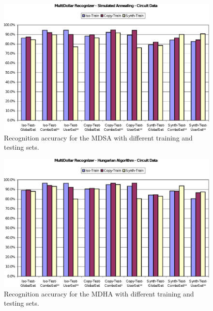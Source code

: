 \documentclass[final,5p,twocolumn]{elsarticle}
\begin{document}
\begin{figure}[p]
\begin{center}
\includegraphics[width=.9\hsize]{MultiDollarSACircuitChart.eps}
\end{center}
\caption{Recognition accuracy for the MDSA with different training and testing sets. }
\label{MultiDollarSACiruit}
\end{figure}

\begin{figure}[p]
\begin{center}
\includegraphics[width=.9\hsize]{MultiDollarHACircuitChart.eps}
\end{center}
\caption{Recognition accuracy for the MDHA with different training and testing sets. }
\label{MultiDollarHACiruit}
\end{figure}
\end{document}

